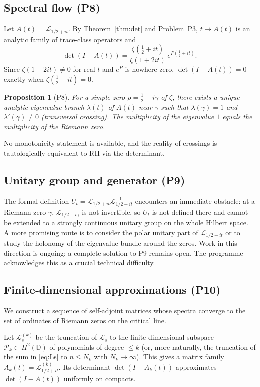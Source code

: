 \documentclass[11pt,a4paper]{article}
\newtheorem{proposition}[theorem]{Proposition}
\theoremstyle{remark}
\newcommand{\cL}{\mathcal{L}}
\begin{document}
\subsection{Spectral flow (P8)}
Let $A(t)=\cL_{1/2+it}$. By Theorem~\ref{thm:det} and Problem~P3, $t\mapsto A(t)$ is an analytic family of trace‑class operators and
\[
\det(I-A(t))=\frac{\zeta(\frac12+it)}{\zeta(1+2it)}\,e^{P(\frac12+it)}.
\]
Since $\zeta(1+2it)\neq0$ for real $t$ and $e^{P}$ is nowhere zero, $\det(I-A(t))=0$ exactly when $\zeta(\frac12+it)=0$.

\begin{proposition}[P8]\label{prop:flow}
For a simple zero $\rho=\frac12+i\gamma$ of $\zeta$, there exists a unique analytic eigenvalue branch $\lambda(t)$ of $A(t)$ near $\gamma$ such that $\lambda(\gamma)=1$ and $\lambda'(\gamma)\neq0$ (transversal crossing). The multiplicity of the eigenvalue $1$ equals the multiplicity of the Riemann zero.
\end{proposition}
No monotonicity statement is available, and the reality of crossings is tautologically equivalent to RH via the determinant.

\subsection{Unitary group and generator (P9)}
The formal definition $U_t=\cL_{1/2+it}\cL_{1/2-it}^{-1}$ encounters an immediate obstacle: at a Riemann zero $\gamma$, $\cL_{1/2+i\gamma}$ is not invertible, so $U_t$ is not defined there and cannot be extended to a strongly continuous unitary group on the whole Hilbert space.  
A more promising route is to consider the polar unitary part of $\cL_{1/2+it}$ or to study the holonomy of the eigenvalue bundle around the zeros. Work in this direction is ongoing; a complete solution to P9 remains open. The programme acknowledges this as a crucial technical difficulty.

\subsection{Finite‑dimensional approximations (P10)}
We construct a sequence of self‑adjoint matrices whose spectra converge to the set of ordinates of Riemann zeros on the critical line.

Let $\cL_s^{(k)}$ be the truncation of $\cL_s$ to the finite‑dimensional subspace $\mathcal{P}_k\subset H^2(\mathbb{D})$ of polynomials of degree $\le k$ (or, more naturally, the truncation of the sum in \eqref{eq:Ls} to $n\le N_k$ with $N_k\to\infty$). This gives a matrix family $A_k(t)=\cL^{(k)}_{1/2+it}$. Its determinant $\det(I-A_k(t))$ approximates $\det(I-A(t))$ uniformly on compacts.
\end{document}

